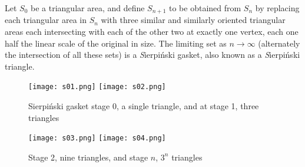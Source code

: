 \documentclass[12pt]{article}
\begin{document}
Let $S_0$ be a triangular area, and define $S_{n+1}$ to be obtained from $S_n$ by replacing each triangular area in $S_n$ with three similar and similarly
oriented triangular areas each intersecting with each of the other two at exactly one vertex, each one half the linear scale of the original in size.  
The limiting set as
$n\rightarrow \infty$ (alternately the intersection of all these sets) is a {\emph Sierpi\'nski gasket}, also known as a {\emph Sierpi\'nski triangle}.
\begin{figure}[h]
\begin{centering}
\texttt{[image: s01.png]}
\texttt{[image: s02.png]}
\caption{Sierpi\'nski gasket stage 0, a single triangle, and at stage 1, three triangles}
\end{centering}
\end{figure}
\begin{figure}[h]
\begin{centering}
\texttt{[image: s03.png]}
\texttt{[image: s04.png]}
\caption{Stage 2, nine triangles, and stage $n$, $3^n$ triangles}
\end{centering}
\end{figure}
\end{document}

